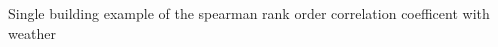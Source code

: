 Single building example of the spearman rank order correlation coefficent with weather
\label{fig:spearman_singlebuilding}